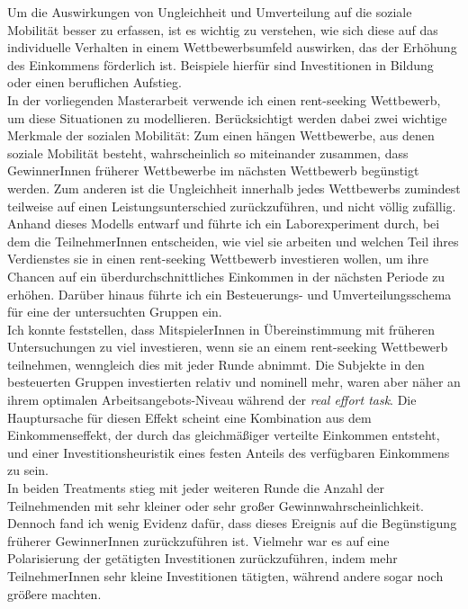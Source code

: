 \begin{small}
Um die Auswirkungen von Ungleichheit und Umverteilung auf die soziale Mobilität besser zu erfassen, ist es wichtig zu verstehen, wie sich diese auf das individuelle Verhalten in einem Wettbewerbsumfeld auswirken, das der Erhöhung des Einkommens förderlich ist. Beispiele hierfür sind Investitionen in Bildung oder einen beruflichen Aufstieg.\\

In der vorliegenden Masterarbeit verwende ich einen rent-seeking Wettbewerb, um diese Situationen zu modellieren. Berücksichtigt werden dabei zwei wichtige Merkmale der sozialen Mobilität: Zum einen hängen Wettbewerbe, aus denen soziale Mobilität besteht, wahrscheinlich so miteinander zusammen, dass GewinnerInnen früherer Wettbewerbe im nächsten Wettbewerb begünstigt werden. Zum anderen ist die Ungleichheit innerhalb jedes Wettbewerbs zumindest teilweise auf einen Leistungsunterschied zurückzuführen, und nicht völlig zufällig.\\

Anhand dieses Modells entwarf und führte ich ein Laborexperiment durch, bei dem die TeilnehmerInnen entscheiden, wie viel sie arbeiten und welchen Teil ihres Verdienstes sie in einen rent-seeking Wettbewerb investieren wollen, um ihre Chancen auf ein überdurchschnittliches Einkommen in der nächsten Periode zu erhöhen. Darüber hinaus führte ich ein Besteuerungs- und Umverteilungsschema für eine der untersuchten Gruppen ein.\\

Ich konnte feststellen, dass MitspielerInnen in Übereinstimmung mit früheren Untersuchungen zu viel investieren, wenn sie an einem rent-seeking Wettbewerb teilnehmen, wenngleich dies mit jeder Runde abnimmt. Die Subjekte in den besteuerten Gruppen investierten relativ und nominell mehr, waren aber näher an ihrem optimalen Arbeitsangebots-Niveau während der \textit{real effort task}. Die Hauptursache für diesen Effekt scheint eine Kombination aus dem Einkommenseffekt, der durch das gleichmäßiger verteilte Einkommen entsteht, und einer Investitionsheuristik eines festen Anteils des verfügbaren Einkommens zu sein.\\

In beiden Treatments stieg mit jeder weiteren Runde die Anzahl der Teilnehmenden mit sehr kleiner oder sehr großer Gewinnwahrscheinlichkeit. Dennoch fand ich wenig Evidenz dafür, dass dieses Ereignis auf die Begünstigung früherer GewinnerInnen zurückzuführen ist. Vielmehr war es auf eine Polarisierung der getätigten Investitionen zurückzuführen, indem mehr TeilnehmerInnen sehr kleine Investitionen tätigten, während andere sogar noch größere machten.\\


\end{small}
